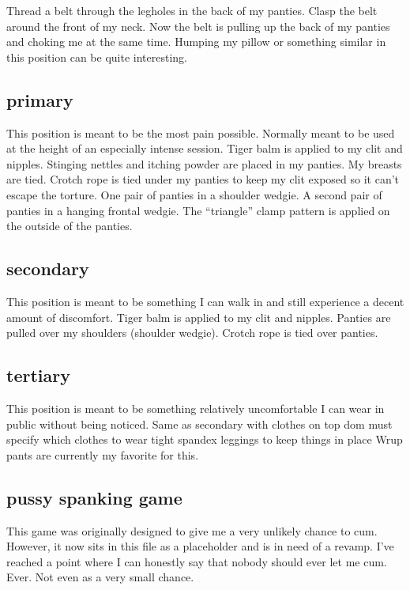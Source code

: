 \documentclass{article}
\begin{document}
Thread a belt through the legholes in the back of my panties.
Clasp the belt around the front of my neck.
Now the belt is pulling up the back of my panties and choking me at the same time.
Humping my pillow or something similar in this position can be quite interesting.

\subsection{primary}

This position is meant to be the most pain possible.
Normally meant to be used at the height of an especially intense session.
Tiger balm is applied to my clit and nipples.
Stinging nettles and itching powder are placed in my panties.
My breasts are tied.
Crotch rope is tied under my panties to keep my clit exposed so it can't escape the torture.
One pair of panties in a shoulder wedgie.
A second pair of panties in a hanging frontal wedgie.
The ``triangle'' clamp pattern is applied on the outside of the panties.

\subsection{secondary}

This position is meant to be something I can walk in and still experience a decent amount of discomfort.
Tiger balm is applied to my clit and nipples.
Panties are pulled over my shoulders (shoulder wedgie).
Crotch rope is tied over panties.

\subsection{tertiary}

This position is meant to be something relatively uncomfortable I can wear in public without being noticed.
Same as secondary with clothes on top
dom must specify which clothes to wear
tight spandex leggings to keep things in place
Wrup pants are currently my favorite for this.

\subsection{pussy spanking game}

This game was originally designed to give me a very unlikely chance to cum.
However, it now sits in this file as a placeholder and is in need of a revamp.
I've reached a point where I can honestly say that nobody should ever let me cum.
Ever.
Not even as a very small chance.
\end{document}

